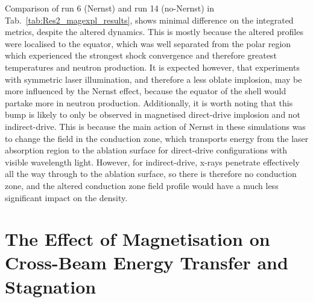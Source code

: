 Comparison of run 6 (Nernst) and run 14 (no-Nernst) in Tab.~\ref{tab:Res2_magexpl_results}, shows minimal difference on the integrated metrics, despite the altered dynamics.
This is mostly because the altered profiles were localised to the equator, which was well separated from the polar region which experienced the strongest shock convergence and therefore greatest temperatures and neutron production.
It is expected however, that experiments with symmetric laser illumination, and therefore a less oblate implosion, may be more influenced by the Nernst effect, because the equator of the shell would partake more in neutron production.
Additionally, it is worth noting that this bump is likely to only be observed in magnetised direct-drive implosion and not indirect-drive.
This is because the main action of Nernst in these simulations was to change the field in the conduction zone, which transports energy from the laser absorption region to the ablation surface for direct-drive configurations with visible wavelength light.
However, for indirect-drive, x-rays penetrate effectively all the way through to the ablation surface, so there is therefore no conduction zone, and the altered conduction zone field profile would have a much less significant impact on the density.

\section{The Effect of Magnetisation on Cross-Beam Energy Transfer and Stagnation}%
\label{sec:Res2_mag_on_CBET}

